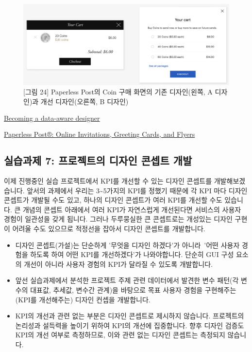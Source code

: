 \documentclass[
  letterpaper,
]{book}
\providecommand{\tightlist}{%
  \setlength{\itemsep}{0pt}\setlength{\parskip}{0pt}}\usepackage{longtable,booktabs,array}
\begin{document}
\begin{figure}[H]

{\centering \includegraphics{img/fig24.png}

}

\caption{{[}그림 24{]} Paperless Post의 Coin 구매 화면의 기존
디자인(왼쪽, A 디자인)과 개선 디자인(오른쪽, B 디자인)}

\end{figure}%

\href{https://uxdesign.cc/becoming-a-data-aware-designer-1d7614ebc3ed}{Becoming
a data-aware designer}

\href{https://www.paperlesspost.com}{Paperless Post®: Online
Invitations, Greeting Cards, and Flyers}

\subsection{실습과제 7: 프로젝트의 디자인 콘셉트
개발}\label{uxc2e4uxc2b5uxacfcuxc81c-7-uxd504uxb85cuxc81duxd2b8uxc758-uxb514uxc790uxc778-uxcf58uxc149uxd2b8-uxac1cuxbc1c}

이제 진행중인 실습 프로젝트에서 KPI를 개선할 수 있는 디자인 콘셉트를
개발해보겠습니다. 앞서의 과제에서 우리는 3\textasciitilde5가지의 KPI를
정했기 때문에 각 KPI 마다 디자인 콘셉트가 개발될 수도 있고, 하나의
디자인 콘셉트가 여러 KPI를 개선할 수도 있습니다. 큰 개념의 콘셉트
아래에서 여러 KPI가 자연스럽게 개선된다면 서비스의 사용자 경험이
일관성을 갖게 됩니다. 그러나 두루뭉실한 큰 콘셉트로는 개성있는 디자인
구현이 어려울 수도 있으므로 적정선을 잡아서 디자인 콘셉트를 개발합니다.

\begin{itemize}
\tightlist
\item
  디자인 콘셉트(가설)는 단순하게 '무엇을 디자인 하겠다'가 아니라~'어떤
  사용자 경험을 하도록 하여 어떤 KPI를 개선하겠다'가 나와야합니다.
  단순히 GUI 구성 요소의 개선이 아니라 사용자 경험의 KPI가 달라질 수
  있도록 개발합니다.
\item
  앞선 실습과제에서 분석한 프로젝트 주제 관련 데이터에서 발견한 변수
  패턴(각 변수의 대표값, 추세값, 변수간 관계)을 바탕으로 목표 사용자
  경험을 구현해주는(KPI를 개선해주는) 디자인 컨셉을 개발합니다.
\item
  KPI의 개선과 관련 없는 부분은 디자인 콘셉트로 제시하지 않습니다.
  프로젝트의 논리성과 설득력을 높이기 위하여 KPI의 개선에 집중합니다.
  향후 디자인 검증도 KPI의 개선 여부로 측정하므로, 이와 관련 없는 디자인
  콘셉트는 측정되지 않습니다.
\end{itemize}
\end{document}

